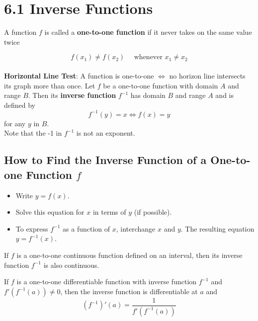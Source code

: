 %
%

\section*{6.1 Inverse Functions}

A function \(f\) is called a \textbf{one-to-one function} if it never takes on the same value twice

\[ f(x_1) \neq f(x_2) \quad \text{ whenever } x_1 \neq x_2 \]
\\
\textbf{Horizontal Line Test}: A function is one-to-one \( \Longleftrightarrow \) no horizon line intersects its graph more than once.
\newline
\noindent
Let \(f\) be a one-to-one function with domain \(A\) and range \(B\). Then its
\textbf{inverse function} \(f^{-1}\) has domain \(B\) and range \(A\) and is defined by
\[ f^{-1}(y)=x \Leftrightarrow f(x)=y \]
for any \(y\) in \(B\).
\\
Note that the -1 in \(f^{-1}\) is not an exponent.

\subsection*{How to Find the Inverse Function of a One-to-one Function \(f\)}

\begin{itemize}
  \item Write \( y=f(x) \).
  \item Solve this equation for \(x\) in terms of \(y\) (if possible).
  \item To express \(f^{-1}\) as a function of \(x\), interchange \(x\) and \(y\). The resulting equation \(y=f^{-1}(x)\).
\end{itemize}

\begin{definition}
If \(f\) is a one-to-one continuous function defined on an interval, then its inverse function \(f^{-1}\) is also continuous.
\end{definition}

\begin{definition}
If \(f\) is a one-to-one differentiable function with inverse function \( f^{-1}\) and \(f'(f^{-1}(a)) \neq 0 \), then the inverse function is differentiable at \(a\) and 
\[ (f^{-1})'(a) = \frac{1}{f'(f^{-1}(a))} \]
\end{definition}
